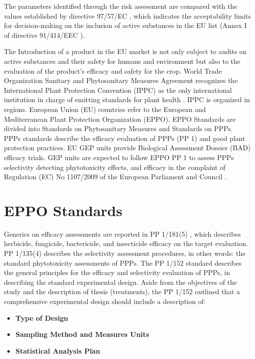 \documentclass[12pt,a4paper,oneside]{report}
\begin{document}
The parameters identified through the risk assessment are compared with the values 
established by directive 97/57/EC \cite{EURLex1997265}, which indicates the acceptability limits for 
decision-making on the inclusion of active substances in the EU list (Annex I of 
directive 91/414/EEC \cite{directive_91_414_EEC}).

The Introduction of a product in the EU market is not only subject to audits on
active substances and their safety for humans and environment but also to the evaluation 
of the product's efficacy and safety for the crop.
World Trade Organization Sanitary and Phytosanitary Measures Agreement \cite{WTO_SPS_Agreement}
recognizes the International Plant Protection Convention (IPPC) as the only international
institution in charge of emitting standards for plant health \cite{IPPC}. IPPC is organized in
regions. European Union (EU) countries refer to the European and Mediterranean Plant
Protection Organization (EPPO). EPPO Standards are divided into Standards on
Phytosanitary Measures and Standards on PPPs. PPPs standards describe the efficacy
evaluation of PPPs (PP 1) and good plant protection practices. EU GEP units provide
Biological Assessment Dossier (BAD) efficacy trials. GEP units are expected to follow
EPPO PP 1 to assess PPPs selectivity detecting phytotoxicity effects, and efficacy in the
complaint of Regulation (EC) No 1107/2009 of the European Parliament and Council \cite{EC_Regulation_1107_2009}.

\section{EPPO Standards}

Generics on efficacy assessments are reported in PP 1/181(5) \cite{EPPO_PP1_181}, which describes
herbicide, fungicide, bactericide, and insecticide efficacy on the target evaluation.
PP 1/135(4) \cite{EPPO_PP1_135} describes the selectivity assessment procedures, 
in other words: the standard phytotoxicity assessments of PPPs.
The PP 1/152 \cite{EPPO_PP1_152} standard describes the general principles for the
efficacy and selectivity evaluation of PPPs, in describing the standard experimental design.
Aside from the objectives of the study and the description of thesis (treatments), 
the PP 1/152 outlined that a comprehensive experimental design should include a description of:
\begin{itemize}
    \item \textbf{Type of Design}
    \item \textbf{Sampling Method and Measures Units}
    \item \textbf{Statistical Analysis Plan}
\end{itemize}
\end{document}
